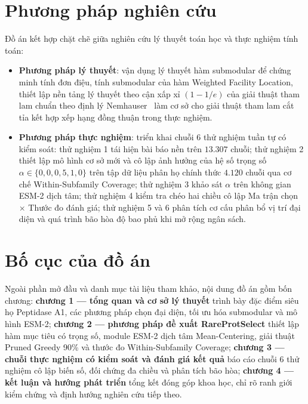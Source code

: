 \section*{Phương pháp nghiên cứu}
Đồ án kết hợp chặt chẽ giữa nghiên cứu lý thuyết toán học và thực nghiệm tính toán:
\begin{itemize}[noitemsep,topsep=1pt,partopsep=0pt,parsep=0pt]
    \item \textbf{Phương pháp lý thuyết}: vận dụng lý thuyết hàm submodular để chứng minh tính đơn điệu, tính submodular của hàm Weighted Facility Location, thiết lập nền tảng lý thuyết theo cận xấp xỉ $(1 - 1/e)$ của giải thuật tham lam chuẩn theo định lý Nemhauser~\cite{nemhauser1978} làm cơ sở cho giải thuật tham lam cắt tỉa kết hợp xếp hạng đồng thuận trong thực nghiệm.
    \item \textbf{Phương pháp thực nghiệm}: triển khai chuỗi 6 thử nghiệm tuần tự có kiểm soát: thử nghiệm 1 tái hiện bài báo nền trên $13.307$ chuỗi; thử nghiệm 2 thiết lập mô hình cơ sở mới và cô lập ảnh hưởng của hệ số trọng số $\alpha \in \{0{,}0, 0{,}5, 1{,}0\}$ trên tập dữ liệu phân họ chính thức $4.120$ chuỗi qua cơ chế Within-Subfamily Coverage; thử nghiệm 3 khảo sát $\alpha$ trên không gian ESM-2 dịch tâm; thử nghiệm 4 kiểm tra chéo hai chiều cô lập Ma trận chọn $\times$ Thước đo đánh giá; thử nghiệm 5 và 6 phân tích cơ cấu phân bổ vị trí đại diện và quá trình bão hòa độ bao phủ khi mở rộng ngân sách.
\end{itemize}

\section*{Bố cục của đồ án}
Ngoài phần mở đầu và danh mục tài liệu tham khảo, nội dung đồ án gồm bốn chương: \textbf{chương 1 --- tổng quan và cơ sở lý thuyết} trình bày đặc điểm siêu họ Peptidase A1, các phương pháp chọn đại diện, tối ưu hóa submodular và mô hình ESM-2; \textbf{chương 2 --- phương pháp đề xuất RareProtSelect} thiết lập hàm mục tiêu có trọng số, module ESM-2 dịch tâm Mean-Centering, giải thuật Pruned Greedy 90\% và thước đo Within-Subfamily Coverage; \textbf{chương 3 --- chuỗi thực nghiệm có kiểm soát và đánh giá kết quả} báo cáo chuỗi 6 thử nghiệm cô lập biến số, đối chứng đa chiều và phân tích bão hòa; \textbf{chương 4 --- kết luận và hướng phát triển} tổng kết đóng góp khoa học, chỉ rõ ranh giới kiểm chứng và định hướng nghiên cứu tiếp theo.

